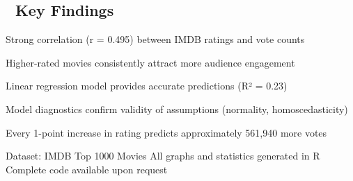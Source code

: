 \documentclass[
]{article}
\begin{document}
\subsection{🎯 Key Findings}\label{key-findings}

Strong correlation (r = 0.495) between IMDB ratings and vote counts

Higher-rated movies consistently attract more audience engagement

Linear regression model provides accurate predictions (R² = 0.23)

Model diagnostics confirm validity of assumptions (normality,
homoscedasticity)

Every 1-point increase in rating predicts approximately 561,940 more
votes

Dataset: IMDB Top 1000 Movies \textbar{} All graphs and statistics
generated in R \textbar{} Complete code available upon request
\end{document}
